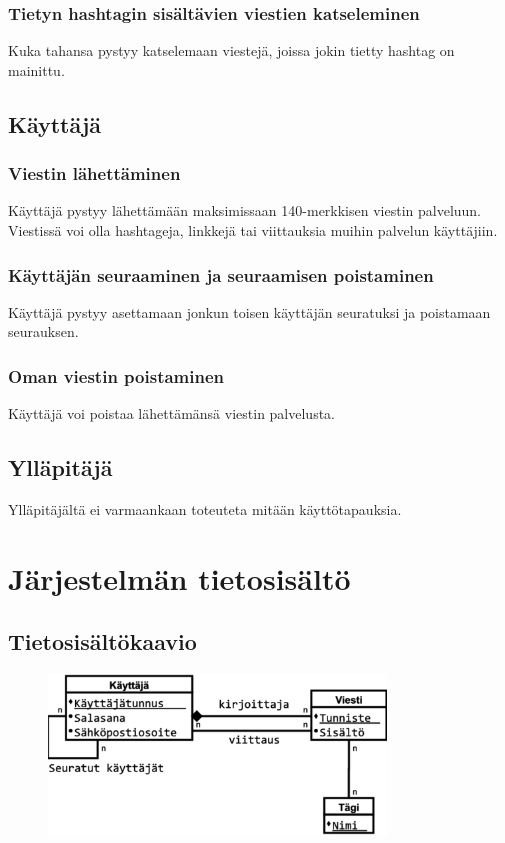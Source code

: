 \documentclass{article}
\let\stdsection\section
\renewcommand\section{\newpage\stdsection}
\begin{document}
\subsubsection{Tietyn hashtagin sisältävien viestien katseleminen}
Kuka tahansa pystyy katselemaan viestejä, joissa jokin tietty hashtag on mainittu.

\subsection{Käyttäjä}

\subsubsection{Viestin lähettäminen}
Käyttäjä pystyy lähettämään maksimissaan 140-merkkisen viestin palveluun. Viestissä voi olla hashtageja, linkkejä tai viittauksia muihin palvelun käyttäjiin.

\subsubsection{Käyttäjän seuraaminen ja seuraamisen poistaminen}
Käyttäjä pystyy asettamaan jonkun toisen käyttäjän seuratuksi ja poistamaan seurauksen.

\subsubsection{Oman viestin poistaminen}
Käyttäjä voi poistaa lähettämänsä viestin palvelusta.

\subsection{Ylläpitäjä}
Ylläpitäjältä ei varmaankaan toteuteta mitään käyttötapauksia.

\section{Järjestelmän tietosisältö}

\subsection{Tietosisältökaavio}

\begin{figure}[H]
    \centering
    \includegraphics[width=0.8\textwidth]{tietosisalto.pdf}
\end{figure}
\end{document}
